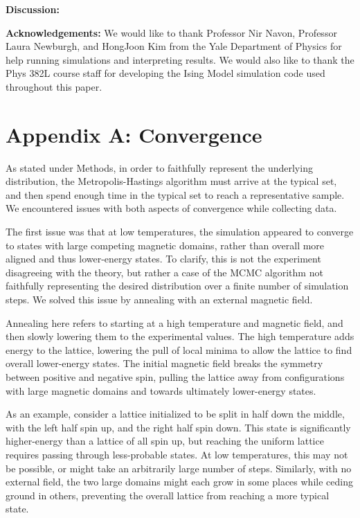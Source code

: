 \documentclass[letter,scriptaddress,twocolumn, prl,nofootinbib]{revtex4}
\begin{document}
\textbf{Discussion:}

\textbf{Acknowledgements:}
	We would like to thank Professor Nir Navon, Professor Laura Newburgh, and HongJoon Kim from the Yale Department of Physics for help running simulations and interpreting results. We would also like to thank the Phys 382L course staff for developing the Ising Model simulation code used throughout this paper.
	
 


\appendix
\section{Appendix A: Convergence}

As stated under Methods, in order to faithfully represent the underlying distribution, the Metropolis-Hastings algorithm must arrive at the typical set, and then spend enough time in the typical set to reach a representative sample. We encountered issues with both aspects of convergence while collecting data.

The first issue was that at low temperatures, the simulation appeared to converge to states with large competing magnetic domains, rather than overall more aligned and thus lower-energy states. To clarify, this is not the experiment disagreeing with the theory, but rather a case of the MCMC algorithm not faithfully representing the desired distribution over a finite number of simulation steps. We solved this issue by annealing with an external magnetic field.

Annealing here refers to starting at a high temperature and magnetic field, and then slowly lowering them to the experimental values. The high temperature adds energy to the lattice, lowering the pull of local minima to allow the lattice to find overall lower-energy states. The initial magnetic field breaks the symmetry between positive and negative spin, pulling the lattice away from configurations with large magnetic domains and towards ultimately lower-energy states. 

As an example, consider a lattice initialized to be split in half down the middle, with the left half spin up, and the right half spin down. This state is significantly higher-energy than a lattice of all spin up, but reaching the uniform lattice requires passing through less-probable states. At low temperatures, this may not be possible, or might take an arbitrarily large number of steps. Similarly, with no external field, the two large domains might each grow in some places while ceding ground in others, preventing the overall lattice from reaching a more typical state.
\end{document}

